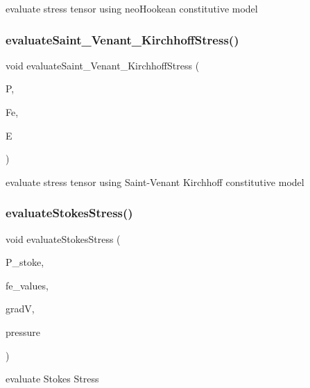 evaluate stress tensor using neo\+Hookean constitutive model \mbox{\label{class_residual_a4215ec5a6eabd7573e0caeee6fd194ad}} 
\subsubsection{\texorpdfstring{evaluateSaint\_Venant\_KirchhoffStress()}{evaluateSaint\_Venant\_KirchhoffStress()}}
{\footnotesize\ttfamily void evaluate\+Saint\+\_\+\+Venant\+\_\+\+Kirchhoff\+Stress (\begin{DoxyParamCaption}\item[{dealii\+::\+Table$<$ 3, T $>$ \&}]{P,  }\item[{dealii\+::\+Table$<$ 3, T $>$ \&}]{Fe,  }\item[{dealii\+::\+Table$<$ 3, T $>$ \&}]{E }\end{DoxyParamCaption})}

evaluate stress tensor using Saint-\/\+Venant Kirchhoff constitutive model \mbox{\label{class_residual_a7e33928364e99df9a42db58752aca7f3}} 
\subsubsection{\texorpdfstring{evaluateStokesStress()}{evaluateStokesStress()}}
{\footnotesize\ttfamily void evaluate\+Stokes\+Stress (\begin{DoxyParamCaption}\item[{dealii\+::\+Table$<$ 3, T $>$}]{P\+\_\+stoke,  }\item[{const F\+E\+Values$<$ dim $>$ \&}]{fe\+\_\+values,  }\item[{Table$<$ 3, T $>$ \&}]{gradV,  }\item[{dealii\+::\+Table$<$ 1, T $>$ \&}]{pressure }\end{DoxyParamCaption})}

evaluate Stokes Stress \mbox{\label{class_residual_a4b181b84ebad5e2adb629b4a542dc9c6}} 

